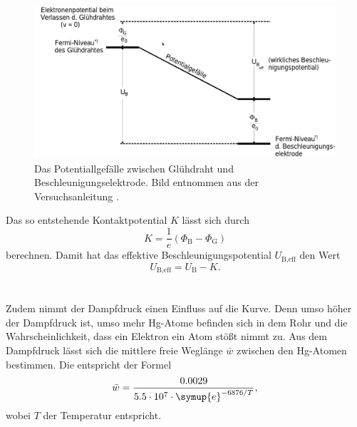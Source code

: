\begin{figure}
    \centering
    \includegraphics[width=\textwidth]{content/data/Potentialgefaelle.png}
    \caption{Das Potentiallgefälle zwischen Glühdraht und Beschleunigungselektrode. Bild entnommen aus der Versuchsanleitung \cite[5]{anleitung}.}
    \label{fig:potential}
\end{figure}
Das so entstehende Kontaktpotential $K$ lässt sich durch 
\begin{equation}
    K = \frac{1}{e} \left ( \Phi_\text{B} - \Phi_\text{G} \right)
    \label{eq:kontaktpotential}
\end{equation}
berechnen.
Damit hat das effektive Beschleunigungspotential $U_\text{B,eff}$ den Wert
\begin{equation}
    U_\text{B,eff} = U_\text{B} - K.
    \label{eq:beschleunigungeffektiv}
\end{equation}
\\\\
Zudem nimmt der Dampfdruck einen Einfluss auf die Kurve.
Denn umso höher der Dampfdruck ist, umso mehr Hg-Atome befinden sich in dem Rohr und die Wahrscheinlichkeit, dass ein Elektron ein Atom stößt nimmt zu.
Aus dem Dampfdruck lässt sich die mittlere freie Weglänge $\bar{w}$ zwischen den Hg-Atomen bestimmen.
Die entspricht der Formel
\begin{equation}
    \bar{w} = \frac{0.0029}{5.5\cdot10^7 \cdot \symup{e}^{-6876/T} },
    \label{eqn:weglaenge}
\end{equation}
wobei $T$ der Temperatur entspricht.